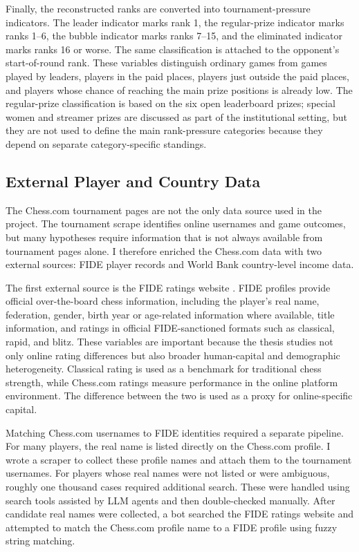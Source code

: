 Finally, the reconstructed ranks are converted into tournament-pressure indicators. The leader indicator marks rank 1, the regular-prize indicator marks ranks 1--6, the bubble indicator marks ranks 7--15, and the eliminated indicator marks ranks 16 or worse. The same classification is attached to the opponent's start-of-round rank. These variables distinguish ordinary games from games played by leaders, players in the paid places, players just outside the paid places, and players whose chance of reaching the main prize positions is already low. The regular-prize classification is based on the six open leaderboard prizes; special women and streamer prizes are discussed as part of the institutional setting, but they are not used to define the main rank-pressure categories because they depend on separate category-specific standings.

\subsection{External Player and Country Data}

The Chess.com tournament pages are not the only data source used in the project. The tournament scrape identifies online usernames and game outcomes, but many hypotheses require information that is not always available from tournament pages alone. I therefore enriched the Chess.com data with two external sources: FIDE player records and World Bank country-level income data.

The first external source is the FIDE ratings website \citep{fide_ratings}. FIDE profiles provide official over-the-board chess information, including the player's real name, federation, gender, birth year or age-related information where available, title information, and ratings in official FIDE-sanctioned formats such as classical, rapid, and blitz. These variables are important because the thesis studies not only online rating differences but also broader human-capital and demographic heterogeneity. Classical rating is used as a benchmark for traditional chess strength, while Chess.com ratings measure performance in the online platform environment. The difference between the two is used as a proxy for online-specific capital.

Matching Chess.com usernames to FIDE identities required a separate pipeline. For many players, the real name is listed directly on the Chess.com profile. I wrote a scraper to collect these profile names and attach them to the tournament usernames. For players whose real names were not listed or were ambiguous, roughly one thousand cases required additional search. These were handled using search tools assisted by LLM agents and then double-checked manually. After candidate real names were collected, a bot searched the FIDE ratings website and attempted to match the Chess.com profile name to a FIDE profile using fuzzy string matching.

